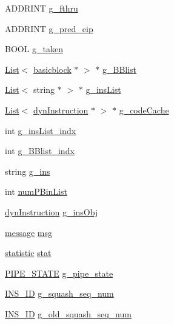 \begin{DoxyCompactItemize}
ADDRINT \hyperlink{structg__variable_ab5c10d6f80328bc1f3c99709d7d5db46}{g\_\-fthru}
\item 
ADDRINT \hyperlink{structg__variable_a3dbb2ea81b5f338970379213c36590ee}{g\_\-pred\_\-eip}
\item 
BOOL \hyperlink{structg__variable_a992a1e746b4ab8d8ef422b522300f769}{g\_\-taken}
\item 
\hyperlink{classList}{List}$<$ \hyperlink{classbasicblock}{basicblock} $\ast$ $>$ $\ast$ \hyperlink{structg__variable_a1664c2b31146ab2b5f77464cd93f2cc8}{g\_\-BBlist}
\item 
\hyperlink{classList}{List}$<$ string $\ast$ $>$ $\ast$ \hyperlink{structg__variable_a527a8f416e63493c83e0f6e50a6bdc79}{g\_\-insList}
\item 
\hyperlink{classList}{List}$<$ \hyperlink{classdynInstruction}{dynInstruction} $\ast$ $>$ $\ast$ \hyperlink{structg__variable_a51bca1da5081c41f7769211509c0358e}{g\_\-codeCache}
\item 
int \hyperlink{structg__variable_aabbfa0530ffffdecf990fb2d64998f4e}{g\_\-insList\_\-indx}
\item 
int \hyperlink{structg__variable_a383af2308cefc8a72db47b1d7a41a702}{g\_\-BBlist\_\-indx}
\item 
string \hyperlink{structg__variable_aa7824f9bbc1a8ff7548bcf42922c0c2b}{g\_\-ins}
\item 
int \hyperlink{structg__variable_a1b0b5933340788334ca1884e1e63707e}{numPBinList}
\item 
\hyperlink{classdynInstruction}{dynInstruction} \hyperlink{structg__variable_aa245bb5b2c0655d82e43c16d5ee4a284}{g\_\-insObj}
\item 
\hyperlink{classmessage}{message} \hyperlink{structg__variable_a59153de8e5186183f6a85ab0ae4e44c0}{msg}
\item 
\hyperlink{classstatistic}{statistic} \hyperlink{structg__variable_a548b9947f5c28cff1174da06598b4903}{stat}
\item 
\hyperlink{global_2global_8h_a06d96fbb727831f9371a39d5486ed5e0}{PIPE\_\-STATE} \hyperlink{structg__variable_a16962c0660efbbd6683962d295e85607}{g\_\-pipe\_\-state}
\item 
\hyperlink{global_2global_8h_a1883c47d0023d0f200e1d86eced6a070}{INS\_\-ID} \hyperlink{structg__variable_a5a33fdb5e89c73f560a2e4ced38ecbf5}{g\_\-squash\_\-seq\_\-num}
\item 
\hyperlink{global_2global_8h_a1883c47d0023d0f200e1d86eced6a070}{INS\_\-ID} \hyperlink{structg__variable_a8d882e5b7f306bd36a428abece71acaf}{g\_\-old\_\-squash\_\-seq\_\-num}
\end{DoxyCompactItemize}


